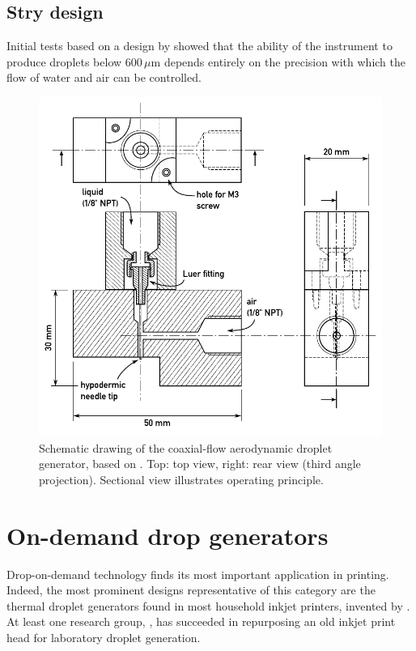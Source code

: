 \documentclass[11.5pt]{book}
\begin{document}
\subsection{Stry design}
Initial tests based on a design by \citet{Stry92} showed that the ability of the
instrument to produce droplets below 600$\,\mu$m depends entirely on the
precision with which the flow of water and air can be controlled.
\begin{figure}
\centering
\includegraphics[width=\textwidth]{img/setup/stry.pdf}
\caption{Schematic drawing of the coaxial-flow aerodynamic droplet generator,
based on \citet{Stry92}. Top: top view, right: rear view (third angle
projection). Sectional view illustrates operating principle.\label{fig:stry}}
\end{figure}

\section{On-demand drop generators}
Drop-on-demand technology finds its most important application in printing.
Indeed, the most prominent designs representative of this category are the thermal droplet
generators found in most household inkjet printers, invented by \citet{Endo88}.
At least one research group, \citet{Sergeyev06}, has succeeded in repurposing
an old inkjet print head for laboratory droplet generation.
\end{document}
